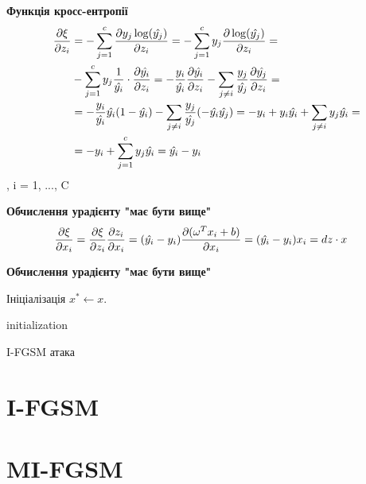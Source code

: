 \documentclass[a4paper,14pt]{extreport}
\newcommand{\tran}{^{T}}
\begin{document}
	\textbf{Функція кросс-ентропії}
	\begin{align*}
		\pdv{\xi}{z_i} 
		&= 
		- \sum_{j=1}^{c} \pdv{ y_j \log (\hat{y_j})}{z_i} 
		=
		- \sum_{j=1}^{c} y_j \pdv{ \log (\hat{y_j})}{z_i} 
		= \\&
		- \sum_{j=1}^{c} y_j \frac{1}{\hat{y_i}} \cdot \pdv{\hat{y_i}}{z_i} 
		= 
		- \frac{y_i}{\hat{y_i}} \pdv{\hat{y_i}}{z_i} - \sum_{j \neq i} \frac{y_j}{\hat{y_j}} \pdv{\hat{y_j}}{z_i} 
		= \\& =
		-\frac{y_i}{\hat{y_i}} \hat{y_i} (1 - \hat{y_i}) - \sum_{j \neq i} \frac{y_j}{\hat{y_j}} (-\hat{y_i} \hat{y_j}) 
		=
		-y_i + y_i \hat{y_i} + \sum_{j \neq i} y_j \hat{y_i}
		= \\& =
		-y_i + \sum_{j=1}^{c} y_j \hat{y_i} 
		=
		\hat{y_i} - y_i
	\end{align*}
	, i = 1, ..., C
	
	\textbf{Обчислення урадієнту "має бути вище"}
	\begin{align*}
		\pdv{\xi}{x_i} 
		&=
		\pdv{\xi}{z_i} \pdv{z_i}{x_i} 
		=
		(\hat{y_i} - y_i) \pdv{(\omega\tran x_i+ b)}{x_i} 
		=
		(\hat{y_i} - y_i) x_i 
		=
		dz \cdot x
	\end{align*}
	
	\textbf{Обчислення урадієнту "має бути вище"}
	
	\begin{algorithm}[H]
		\SetAlgoLined
		
		Ініціалізація $x^{*} \leftarrow x. $
		
		initialization\;
		\caption{I-FGSM атака}
	\end{algorithm}

	\section{I-FGSM}


	\section{MI-FGSM} 
\end{document}
